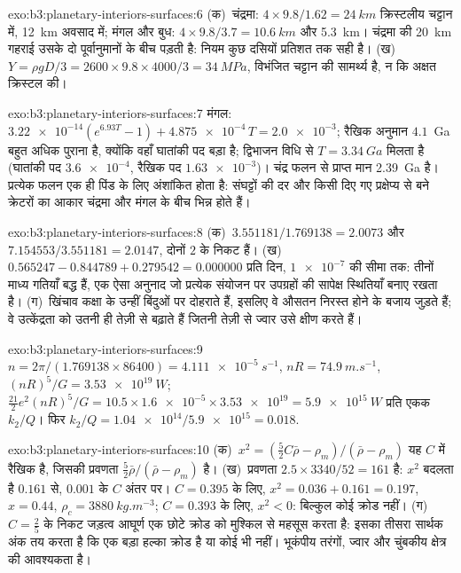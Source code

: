 \begin{solution}{exo:b3:planetary-interiors-surfaces:6}
(क)~चंद्रमा: $4\times9.8/1.62 = \qty{24}{km}$ क्रिस्टलीय चट्टान में,
\qty{12}{km} अवसाद में; मंगल और बुध: $4\times9.8/3.7 =
\qty{10.6}{km}$ और \qty{5.3}{km}। चंद्रमा की \qty{20}{km} गहराई उसके दो पूर्वानुमानों
के बीच पड़ती है: नियम कुछ दसियों प्रतिशत तक सही है। (ख)~$Y =
\rho gD/3 = 2600\times9.8\times4000/3 = \qty{34}{MPa}$, विभंजित चट्टान की
सामर्थ्य है, न कि अक्षत क्रिस्टल की।
\end{solution}

\begin{solution}{exo:b3:planetary-interiors-surfaces:7}
मंगल: $\num{3.22e-14}(e^{6.93T} - 1) + \num{4.875e-4}\,T = \num{2.0e-3}$;
रैखिक अनुमान $4.1$~Ga बहुत अधिक पुराना है, क्योंकि
वहाँ घातांकी पद बड़ा है; द्विभाजन विधि से $T = \qty{3.34}{Ga}$ मिलता है (घातांकी पद
$\num{3.6e-4}$, रैखिक पद $\num{1.63e-3}$)। चंद्र फलन से प्राप्त
मान \qty{2.39}{Ga} है। प्रत्येक फलन एक ही पिंड के लिए अंशांकित होता है: संघट्टों की दर
और किसी दिए गए प्रक्षेप्य से बने क्रेटरों का आकार
चंद्रमा और मंगल के बीच भिन्न होते हैं।
\end{solution}

\begin{solution}{exo:b3:planetary-interiors-surfaces:8}
(क)~$3.551181/1.769138 = 2.0073$ और $7.154553/3.551181 = 2.0147$, दोनों
$2$ के निकट हैं। (ख)~$0.565247 - 0.844789 + 0.279542 = 0.000000$ प्रति दिन, $\num{1e-7}$
की सीमा तक: तीनों माध्य गतियाँ बद्ध हैं, एक ऐसा अनुनाद जो प्रत्येक संयोजन पर उपग्रहों की
सापेक्ष स्थितियाँ बनाए रखता है। (ग)~खिंचाव कक्षा के
उन्हीं बिंदुओं पर दोहराते हैं, इसलिए वे औसतन निरस्त होने के बजाय जुड़ते हैं;
वे उत्केंद्रता को उतनी ही तेज़ी से बढ़ाते हैं जितनी तेज़ी से ज्वार उसे क्षीण करते हैं।
\end{solution}

\begin{solution}{exo:b3:planetary-interiors-surfaces:9}
$n = 2\pi/(1.769138\times86400) = \qty{4.111e-5}{s^{-1}}$, $nR =
\qty{74.9}{m.s^{-1}}$, $(nR)^5/G = \qty{3.53e19}{W}$;
$\tfrac{21}{2}e^2(nR)^5/G = 10.5\times\num{1.6e-5}\times\num{3.53e19} =
\qty{5.9e15}{W}$ प्रति एकक $k_2/Q$। फिर $k_2/Q =
\num{1.04e14}/\num{5.9e15} = 0.018$.
\end{solution}

\begin{solution}{exo:b3:planetary-interiors-surfaces:10}
(क)~$x^2 = (\tfrac52C\bar\rho - \rho_m)/(\bar\rho - \rho_m)$ यह
$C$ में रैखिक है, जिसकी प्रवणता $\tfrac52\bar\rho/(\bar\rho - \rho_m)$ है। (ख)~प्रवणता
$2.5\times3340/52 = 161$ है: $x^2$ बदलता है $0.161$ से, $0.001$ के $C$ अंतर पर।
$C = 0.395$ के लिए, $x^2 = 0.036 + 0.161 = 0.197$, $x = 0.44$, $\rho_c =
\qty{3880}{kg.m^{-3}}$; $C = 0.393$ के लिए, $x^2 < 0$: बिल्कुल कोई क्रोड नहीं।
(ग)~$C = \tfrac25$ के निकट जड़त्व आघूर्ण एक छोटे क्रोड को मुश्किल से महसूस करता है:
इसका तीसरा सार्थक अंक तय करता है कि एक बड़ा हल्का क्रोड है या कोई भी नहीं।
भूकंपीय तरंगों, ज्वार और चुंबकीय क्षेत्र की आवश्यकता है।
\end{solution}

